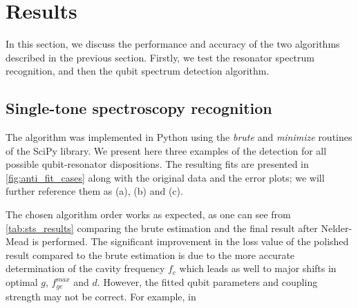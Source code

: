 \documentclass[%
 aip,
 amsmath,amssymb,
 reprint,%
]{revtex4-1}
\begin{document}
\section{Results}

In this section, we discuss the performance and accuracy of the two algorithms described in the previous section. Firstly, we test the resonator spectrum recognition, and then the qubit spectrum detection algorithm.

\subsection{Single-tone spectroscopy recognition}

The algorithm was implemented in Python using the \textit{brute} and \textit{minimize} routines of the SciPy\cite{scipy} library. We present here three examples of the detection for all possible qubit-resonator dispositions.  The resulting fits are presented in \autoref{fig:anti_fit_cases} along with the original data and the error plots; we will further reference them as (a), (b) and (c). 

The chosen algorithm order works as expected, as one can see from \autoref{tab:sts_results} comparing the brute estimation and  the final result after Nelder-Mead is performed. 	The significant improvement in the loss value of the polished result compared to the brute estimation is due to the more accurate determination of the cavity frequency $f_c$ which leads as well to major shifts in optimal $g$, $f_{ge}^{max}$ and $d$. However, the fitted qubit parameters and coupling strength may not be correct. For example, in 
\end{document}
